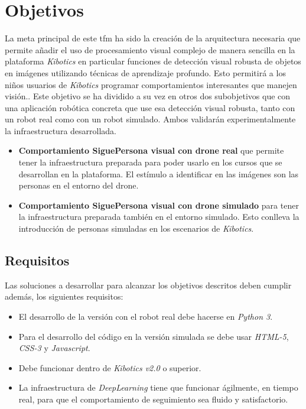\section{Objetivos}\label{sec.objetivos}

La meta principal de este \acrshort{tfm} ha sido la creación de la arquitectura necesaria que permite añadir el uso de procesamiento visual complejo de manera sencilla en la plataforma \textit{Kibotics} en particular funciones de detección visual robusta de objetos en imágenes utilizando técnicas de aprendizaje profundo. Esto permitirá a los niños usuarios de \textit{Kibotics} programar comportamientos interesantes que manejen visión.. Este objetivo se ha dividido a su vez en otros dos subobjetivos que con una aplicación robótica concreta que use esa detección visual robusta, tanto con un robot real como con un robot simulado. Ambos validarán experimentalmente la infraestructura desarrollada.

\begin{itemize}
  \item \textbf{Comportamiento SiguePersona visual con drone real} que permite tener la infraestructura preparada para poder usarlo en los cursos que se desarrollan en la plataforma. El estímulo a identificar en las imágenes son las personas en el entorno del drone.
  \item \textbf{Comportamiento SiguePersona visual con drone simulado} para tener la infraestructura preparada también en el entorno simulado. Esto conlleva la introducción de personas simuladas en los escenarios de \textit{Kibotics}.
\end{itemize}

\subsection*{Requisitos}
Las soluciones a desarrollar para alcanzar los objetivos descritos deben cumplir además, los siguientes requisitos:

\begin{itemize}
  \item El desarrollo de la versión con el robot real debe hacerse en \textit{Python 3}.
  \item Para el desarrollo del código en la versión simulada se debe usar \textit{HTML-5}, \textit{CSS-3} y \textit{Javascript}.
  \item Debe funcionar dentro de \textit{Kibotics v2.0} o superior.
  \item La infraestructura de \textit{DeepLearning} tiene que funcionar ágilmente, en tiempo real, para que el comportamiento de seguimiento sea fluido y satisfactorio.
\end{itemize}